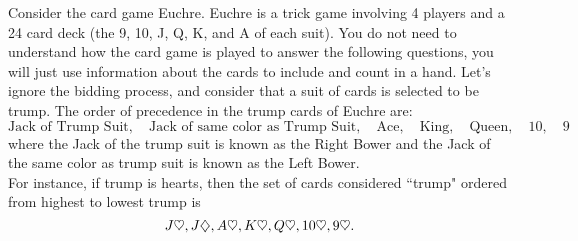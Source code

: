 \begin{questions}



\bonusquestion[6] Consider the card game Euchre.  Euchre is a trick game involving 4 players and a 24 card deck (the 9, 10, J, Q, K, and A of each suit).  You do not need to understand how the card game is played to answer the following questions, you will just use information about the cards to include and count in a hand. Let's ignore the bidding process, and consider that a suit of cards is selected to be trump. The order of precedence in the trump cards of Euchre are: \\
  \[ \text{Jack of Trump Suit}, \quad \text{Jack of same color as Trump Suit}, \quad \text{Ace}, \quad \text{King}, \quad \text{Queen}, \quad 10, \quad 9  \]
  where the Jack of the trump suit is known as the Right Bower and the Jack of the same color as trump suit is known as the Left Bower. \\
  For instance, if trump is hearts, then the set of cards considered ``trump" ordered from highest to lowest trump is 
    \[ J\heartsuit, J\diamondsuit, A\heartsuit, K\heartsuit, Q\heartsuit, 10\heartsuit, 9\heartsuit. \]

\end{questions}
